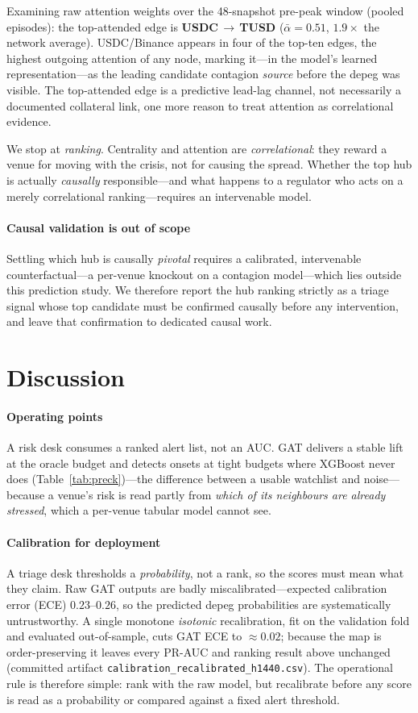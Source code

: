 \documentclass[sigconf,anonymous]{acmart}
\begin{document}
Examining raw attention weights over the 48-snapshot pre-peak window (pooled episodes): the top-attended edge is \textbf{USDC$\,\to\,$TUSD} ($\bar\alpha=0.51$, $1.9\times$ the network average). USDC/Binance appears in four of the top-ten edges, the highest outgoing attention of any node, marking it---in the model's learned representation---as the leading candidate contagion \emph{source} before the depeg was visible. The top-attended edge is a predictive lead-lag channel, not necessarily a documented collateral link, one more reason to treat attention as correlational evidence.

We stop at \emph{ranking}. Centrality and attention are \emph{correlational}: they reward a venue for
moving with the crisis, not for causing the spread. Whether the top hub is actually \emph{causally}
responsible---and what happens to a regulator who acts on a merely correlational ranking---requires
an intervenable model.

\paragraph{Causal validation is out of scope} Settling which hub is causally \emph{pivotal}
requires a calibrated, intervenable counterfactual---a per-venue knockout on a contagion
model---which lies outside this prediction study. We therefore report the hub ranking strictly
as a triage signal whose top candidate must be confirmed causally before any intervention, and
leave that confirmation to dedicated causal work.

\section{Discussion}
\paragraph{Operating points} A risk desk consumes a ranked alert list, not an AUC. GAT delivers a
stable lift at the oracle budget and detects onsets at tight budgets where XGBoost never does
(Table~\ref{tab:preck})---the difference between a usable watchlist and noise---because a venue's risk
is read partly from \emph{which of its neighbours are already stressed}, which a per-venue tabular
model cannot see.

\paragraph{Calibration for deployment} A triage desk thresholds a \emph{probability}, not a rank, so the
scores must mean what they claim. Raw GAT outputs are badly miscalibrated---expected calibration error
(ECE) $0.23$--$0.26$, so the predicted depeg probabilities are systematically untrustworthy. A single
monotone \emph{isotonic} recalibration, fit on the validation fold and evaluated out-of-sample, cuts GAT
ECE to ${\approx}0.02$; because the map is order-preserving it leaves every PR-AUC and ranking result
above unchanged (committed artifact \texttt{calibration\_recalibrated\_h1440.csv}). The operational rule
is therefore simple: rank with the raw model, but recalibrate before any score is read as a probability
or compared against a fixed alert threshold.
\end{document}
